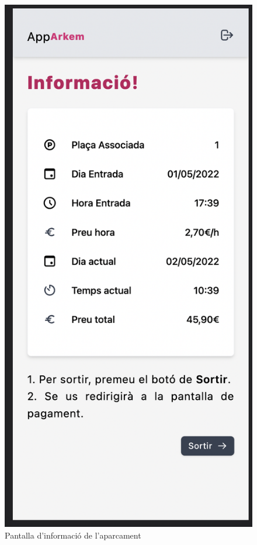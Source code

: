 \begin{figure}[H]
    \begin{center}
        \includegraphics[scale=0.50]{Fotos/pantalla4_informacio.png}
    \end{center}
    \caption{Pantalla d'informació de l'aparcament}
    \label{fig:information_photo}
\end{figure}

